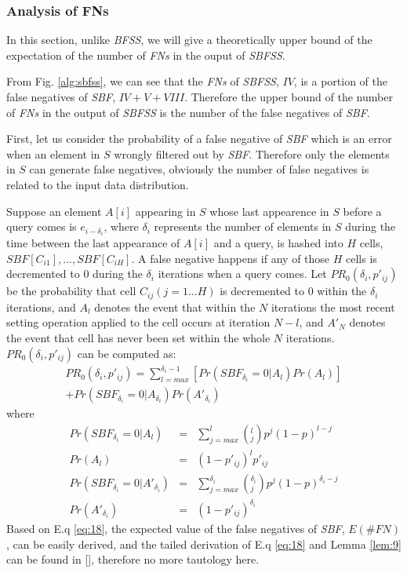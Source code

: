 \documentclass[conference]{IEEEtran}
\begin{document}
\subsubsection{\textbf{Analysis of FNs}}
In this section, unlike \emph{BFSS}, we will give a theoretically upper bound of the expectation of the number of \emph{FNs} in the ouput of \emph{SBFSS}. \par
From Fig. \ref{alg:sbfss}, we can see that the \emph{FNs} of \emph{SBFSS}, $IV$, is a portion of the false negatives of \emph{SBF}, $IV+V+VIII$. Therefore the upper bound of the number of \emph{FNs} in the output of \emph{SBFSS} is the number of the false negatives of \emph{SBF}.\par
First, let us consider the probability of a false negative of \emph{SBF} which is an error when an element in $S$ wrongly filtered out by \emph{SBF}. Therefore only the elements in $S$ can generate false negatives, obviously the number of false negatives is related to the input data distribution.\par
Suppose an element $A[i]$ appearing in $S$ whose last appearence in $S$ before a query comes is $e_{i-\delta_i}$, where $\delta_i$ represents the number of elements in $S$ during the time between the last appearance of $A[i]$ and a query, is hashed into $H$ cells, $SBF[C_{i1}],...,SBF[C_{iH}]$. A false negative happens if any of those $H$ cells is decremented to 0 during the $\delta_i$ iterations when a query comes. Let $PR_0(\delta_i,p'_{ij})$ be the probability that cell $C_{ij} (j = 1...H)$ is decremented to 0 within the $\delta_i$ iterations, and $A_l$ denotes the event that within the $N$ iterations the most recent setting operation applied to the cell occurs at iteration $N-l$, and $A'_N$ denotes the event that cell has never been set within the whole $N$ iterations. $PR_0(\delta_i,p'_{ij})$ can be computed as:
\begin{equation}\label{eq:18}
\begin{split}
PR_0(\delta_i,p'_{ij})=\sum_{l=max}^{\delta_i-1}[Pr(SBF_{\delta_i}=0|A_l)Pr(A_l)]\\
+Pr(SBF_{\delta_i}=0|A_{\delta_i})Pr(A'_{\delta_i})
\end{split}
\end{equation}
where 
\setlength{\arraycolsep}{0.0em}
\begin{eqnarray}\label{eq:19}
Pr(SBF_{\delta_i}=0|A_l)&=&\sum_{j=max}^{l}\left(^l_j\right)p^j(1-p)^{l-j}\\
Pr(A_l)&=&(1-p'_{ij})^lp'_{ij}\\
Pr(SBF_{\delta_i}=0|A'_{\delta_i})&=&\sum_{j=max}^{\delta_i}\left(^{\delta_i}_j\right)p^j(1-p)^{\delta_i-j}\\
Pr(A'_{\delta_i})&=&(1-p'_{ij})^{\delta_i}
\end{eqnarray}
\setlength{\arraycolsep}{5pt}
Based on E.q \ref{eq:18}, the expected value of the false negatives of \emph{SBF}, $E(\#FN)$, can be easily derived, and the tailed derivation of E.q \ref{eq:18} and Lemma \ref{lem:9} can be found in [], therefore no more tautology here.\par
\end{document}
